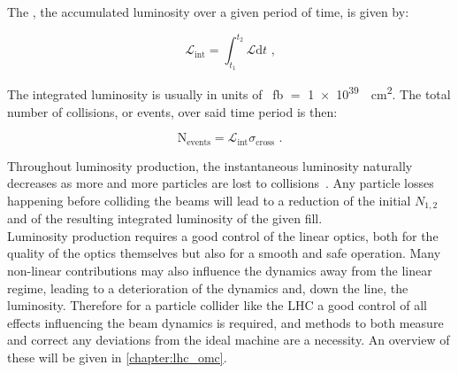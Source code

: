 The , the accumulated luminosity over a given period of time, is given by:

\begin{equation}
    \mathcal{L}_{\mathrm{int}} = \int_{t_1}^{t_2} \mathcal{L} \mathrm{d}t \text{ ,}
    \label{equation:integrated_luminosity}
\end{equation}

The integrated luminosity is usually in units of \unit{\per\femto\barn} \(=\) \qty{1e39}{\per\square\centi\meter}.
The total number of collisions, or events, over said time period is then:

\begin{equation}
    \mathrm{N_{events}} = \mathcal{L}_{\mathrm{int}} \sigma_{\mathrm{cross}} \text{ .}
    \label{equation:total_number_collisions}
\end{equation}

Throughout luminosity production, the instantaneous luminosity naturally decreases as more and more particles are lost to collisions~\cite{PRES:Hostettler:LHC_Lumi_Lifetime}.
Any particle losses happening before colliding the beams will lead to a reduction of the initial \(N_{1,2}\) and of the resulting integrated luminosity of the given fill.\\

Luminosity production requires a good control of the linear optics, both for the quality of the optics themselves but also for a smooth and safe operation.
Many non-linear contributions may also influence the dynamics away from the linear regime, leading to a deterioration of the dynamics and, down the line, the luminosity.
Therefore for a particle collider like the LHC a good control of all effects influencing the beam dynamics is required, and methods to both measure and correct any deviations from the ideal machine are a necessity.
An overview of these will be given in \cref{chapter:lhc_omc}.

